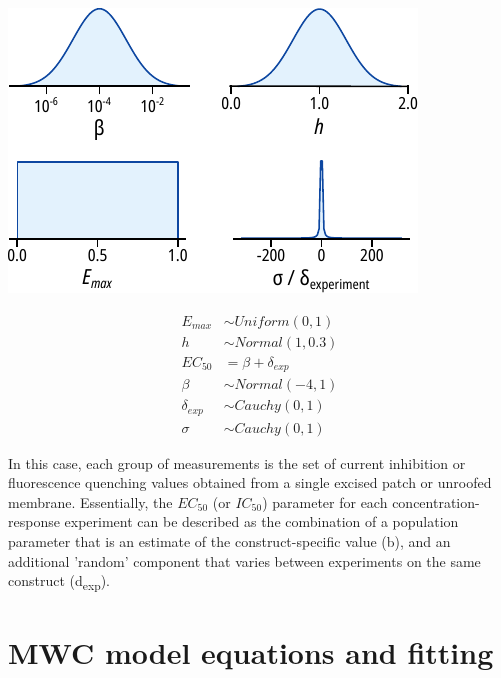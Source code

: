 \begin{minipage}{.5\textwidth}
\centering
\includegraphics[width=\textwidth]{drc_priors.pdf}
\end{minipage}
\begin{minipage}{.5\textwidth}
\centering
\begin{equation} \label{eq:drc_priors}
\begin{split}
E_{max} &\sim Uniform(0, 1) \\
h &\sim Normal(1, 0.3) \\
EC_{50} &= \beta + \delta_{exp} \\
\beta &\sim Normal(-4, 1) \\
\delta_{exp} &\sim Cauchy(0, 1) \\
\sigma &\sim Cauchy(0, 1)
\end{split}
\end{equation}
\end{minipage}

In this case, each group of measurements is the set of current inhibition or fluorescence quenching values obtained from a single excised patch or unroofed membrane.
Essentially, the $EC_{50}$ (or $IC_{50}$) parameter for each concentration-response experiment can be described as the combination of a population parameter that is an estimate of the construct-specific value (\textgreek{b}), and an additional 'random' component that varies between experiments on the same construct (\textgreek{d}\textsubscript{exp}).

\section{MWC model equations and fitting}

